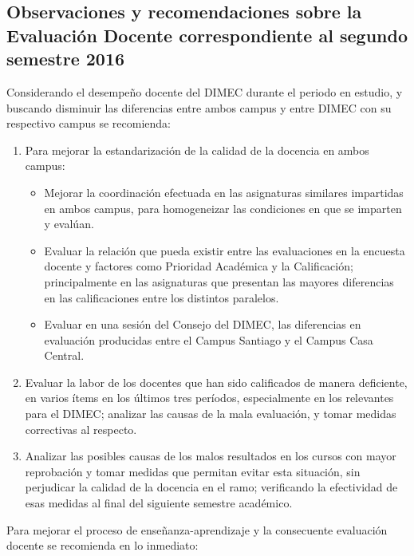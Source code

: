 \documentclass[12pt]{article}
\begin{document}
\subsection{Observaciones y recomendaciones sobre la Evaluación Docente correspondiente al segundo semestre 2016}

\begin{text}
Considerando el desempeño docente del DIMEC durante el periodo en estudio, y buscando disminuir las diferencias entre ambos campus y entre DIMEC con su respectivo campus se recomienda:

\begin{enumerate}
    \item Para mejorar la estandarización de la calidad de la docencia en ambos campus: \\                 \begin{itemize}
            \item Mejorar la coordinación efectuada en las asignaturas similares impartidas en ambos campus, para homogeneizar las condiciones en que se imparten y evalúan. 
            \item Evaluar la relación que pueda existir entre las evaluaciones en la encuesta docente y factores como Prioridad Académica y la Calificación; principalmente en las asignaturas que presentan las mayores diferencias en las calificaciones entre los distintos paralelos. 
            \item Evaluar en una sesión del Consejo del DIMEC, las diferencias en evaluación producidas entre el Campus Santiago y el Campus Casa Central. 
        \end{itemize}
    \item Evaluar la labor de los docentes que han sido calificados de manera deficiente, en varios ítems en los últimos tres períodos, especialmente en los  relevantes para el DIMEC; analizar las causas de la mala evaluación, y tomar medidas correctivas al respecto.
    \item Analizar las posibles causas de los malos resultados en los cursos con mayor reprobación y tomar medidas que permitan evitar esta situación, sin perjudicar la calidad de la docencia en el ramo; verificando la efectividad de esas medidas al final del siguiente semestre académico.
\end{enumerate} \par

Para mejorar el proceso de enseñanza-aprendizaje y la consecuente evaluación docente se recomienda en lo inmediato:


\end{text}
\end{document}
